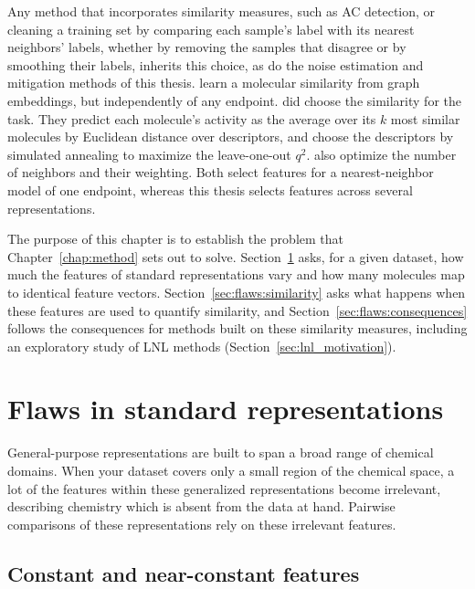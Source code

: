 Any method that incorporates similarity measures, such as AC detection, or cleaning a training set by comparing each sample's label with its nearest neighbors' labels, whether by removing the samples that disagree \citep{Wilson1972} or by smoothing their labels, inherits this choice, as do the noise estimation and mitigation methods of this thesis. \citet{Coupry2022} learn a molecular similarity from graph embeddings, but independently of any endpoint. \citet{Zheng2000} did choose the similarity for the task. They predict each molecule's activity as the average over its $k$ most similar molecules by Euclidean distance over descriptors, and choose the descriptors by simulated annealing to maximize the leave-one-out $q^2$. \citet{Itskowitz2005} also optimize the number of neighbors and their weighting. Both select features for a nearest-neighbor model of one endpoint, whereas this thesis selects features across several representations.

The purpose of this chapter is to establish the problem that Chapter~\ref{chap:method} sets out to solve. Section~\ref{sec:flaws:representations} asks, for a given dataset, how much the features of standard representations vary and how many molecules map to identical feature vectors. Section~\ref{sec:flaws:similarity} asks what happens when these features are used to quantify similarity, and Section~\ref{sec:flaws:consequences} follows the consequences for methods built on these similarity measures, including an exploratory study of LNL methods (Section~\ref{sec:lnl_motivation}).


\section{Flaws in standard representations}\label{sec:flaws:representations}

General-purpose representations are built to span a broad range of chemical domains. When your dataset covers only a small region of the chemical space, a lot of the features within these generalized representations become irrelevant, describing chemistry which is absent from the data at hand. Pairwise comparisons of these representations rely on these irrelevant features.


\subsection{Constant and near-constant features}\label{sec:flaws:constant} 

